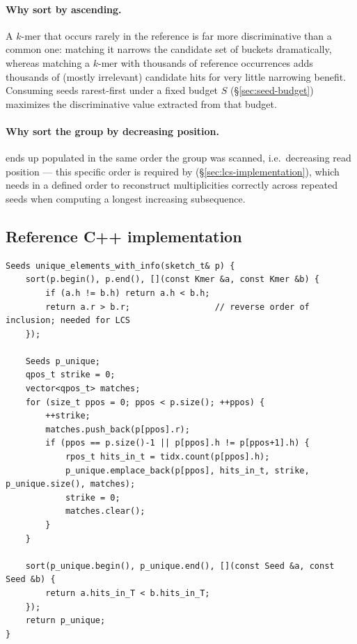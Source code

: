 \paragraph{Why sort by  ascending.} A $k$-mer that occurs rarely in the
reference is far more discriminative than a common one: matching it narrows the candidate set of
buckets dramatically, whereas matching a $k$-mer with thousands of reference occurrences adds
thousands of (mostly irrelevant) candidate hits for very little narrowing benefit. Consuming
seeds rarest-first under a fixed budget $S$ (\S\ref{sec:seed-budget}) maximizes the discriminative
value extracted from that budget.

\paragraph{Why sort the group by decreasing position.}  ends up populated in
the same order the group was scanned, i.e.\ decreasing read position --- this specific order is
required by  (\S\ref{sec:lcs-implementation}), which needs  in
a defined order to reconstruct multiplicities correctly across repeated seeds when computing a
longest increasing subsequence.

\subsection{Reference C++ implementation}

\begin{lstlisting}[style=cppstyle,caption={\code{unique\_elements\_with\_info}, \texttt{src/shmap.h}}]
Seeds unique_elements_with_info(sketch_t& p) {
    sort(p.begin(), p.end(), [](const Kmer &a, const Kmer &b) {
        if (a.h != b.h) return a.h < b.h;
        return a.r > b.r;                 // reverse order of inclusion; needed for LCS
    });

    Seeds p_unique;
    qpos_t strike = 0;
    vector<qpos_t> matches;
    for (size_t ppos = 0; ppos < p.size(); ++ppos) {
        ++strike;
        matches.push_back(p[ppos].r);
        if (ppos == p.size()-1 || p[ppos].h != p[ppos+1].h) {
            rpos_t hits_in_t = tidx.count(p[ppos].h);
            p_unique.emplace_back(p[ppos], hits_in_t, strike, p_unique.size(), matches);
            strike = 0;
            matches.clear();
        }
    }

    sort(p_unique.begin(), p_unique.end(), [](const Seed &a, const Seed &b) {
        return a.hits_in_T < b.hits_in_T;
    });
    return p_unique;
}
\end{lstlisting}

